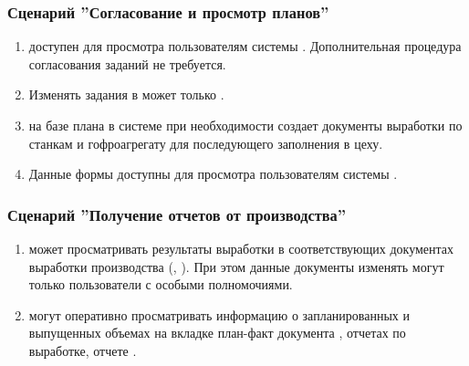 \begin{enumerate}
\end{enumerate}





\subsubsection{Сценарий ''Согласование и просмотр планов''}
\label{bp:plan_5}
\begin{enumerate}

\item	{} доступен для просмотра пользователям системы \gofro. Дополнительная процедура согласования заданий не требуется.
\item	Изменять задания в  может только \planner.


\item	\planner на базе плана в системе \gofro при необходимости создает документы выработки по станкам и гофроагрегату для последующего заполнения в цеху.
\item Данные формы	 доступны для просмотра пользователям системы \gofro.


\end{enumerate}


\subsubsection{Сценарий ''Получение отчетов от производства''}
\label{bp:plan_6}


\begin{enumerate}


\item \planner может просматривать результаты выработки в соответствующих документах выработки производства (, ). При этом данные документы изменять могут только пользователи с особыми полномочиями.
\item \manager могут оперативно просматривать информацию о запланированных и выпущенных объемах на вкладке план-факт документа , отчетах по выработке, отчете .
\end{enumerate}




